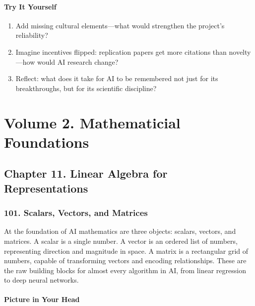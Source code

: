\documentclass[
  letterpaper,
  DIV=11,
  numbers=noendperiod]{scrreprt}
\providecommand{\tightlist}{%
  \setlength{\itemsep}{0pt}\setlength{\parskip}{0pt}}
\begin{document}
\subsubsection{Try It Yourself}\label{try-it-yourself-99}

\begin{enumerate}
\def\labelenumi{\arabic{enumi}.}
\tightlist
\item
  Add missing cultural elements---what would strengthen the project's
  reliability?
\item
  Imagine incentives flipped: replication papers get more citations than
  novelty---how would AI research change?
\item
  Reflect: what does it take for AI to be remembered not just for its
  breakthroughs, but for its scientific discipline?
\end{enumerate}


\chapter{Volume 2. Mathematicial
Foundations}\label{volume-2.-mathematicial-foundations}

\section{Chapter 11. Linear Algebra for
Representations}\label{chapter-11.-linear-algebra-for-representations}

\subsection{101. Scalars, Vectors, and
Matrices}\label{scalars-vectors-and-matrices}

At the foundation of AI mathematics are three objects: scalars, vectors,
and matrices. A scalar is a single number. A vector is an ordered list
of numbers, representing direction and magnitude in space. A matrix is a
rectangular grid of numbers, capable of transforming vectors and
encoding relationships. These are the raw building blocks for almost
every algorithm in AI, from linear regression to deep neural networks.

\subsubsection{Picture in Your Head}\label{picture-in-your-head-100}
\end{document}
